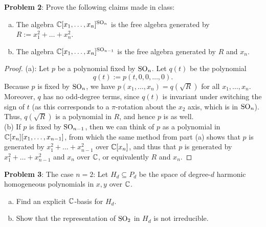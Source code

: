 \documentclass{amsart}
\begin{document}
	\newpage
	
	\noindent \textbf{Problem 2}: Prove the following claims made in class:
	\begin{enumerate}[(a)]
	\item The algebra $\mathbb{C}[x_1,\dots,x_n]^{\operatorname{SO}_n}$ is the free algebra generated by $R:= x_1^2+\dots+x_n^2$.
	\item The algebra $\mathbb{C}[x_1,\dots,x_n]^{\operatorname{SO}_{n-1}}$ is the free algebra generated by $R$ and $x_n$.
	\end{enumerate}
	
	\begin{proof}
		(a): Let $p$ be a polynomial fixed by $\operatorname{SO}_n$. Let $q(t)$ be the polynomial
		$$
		q(t) := p(t,0,0,\dots,0).
		$$
		Because $p$ is fixed by $\operatorname{SO}_n$, we have $p(x_1,\dots,x_n) = q(\sqrt{R})$ for all $x_1,\dots,x_n$. Moreover, $q$ has no odd-degree terms, since $q(t)$ is invariant under switching the sign of $t$ (as this corresponds to a $\pi$-rotation about the $x_2$ axis, which is in $\operatorname{SO}_n$). Thus, $q(\sqrt{R})$ is a polynomial in $R$, and hence $p$ is as well.\\
		
		(b) If $p$ is fixed by $\operatorname{SO}_{n-1}$, then we can think of $p$ as a polynomial in $\mathbb{C}[x_n][x_1,\dots,x_{n-1}]$, from which the same method from part (a) shows that $p$ is generated by $x_1^2+\dots+x_{n-1}^2$ over $\mathbb{C}[x_n]$, and thus that $p$ is generated by $x_1^2+\dots+x_{n-1}^2$ and $x_n$ over $\mathbb{C}$, or equivalently $R$ and $x_n$. 
	\end{proof}
	
	\newpage
	
	\noindent \textbf{Problem 3}: The case $n=2$: Let $H_d\subseteq P_d$ be the space of degree-$d$ harmonic homogeneous polynomials in $x,y$ over $\mathbb{C}$.
	\begin{enumerate}[(a)]
	\item Find an explicit $\mathbb{C}$-basis for $H_d$.
	\item Show that the representation of $\operatorname{SO}_2$ in $H_d$ is not irreducible.
	\end{enumerate}
	
\end{document}
